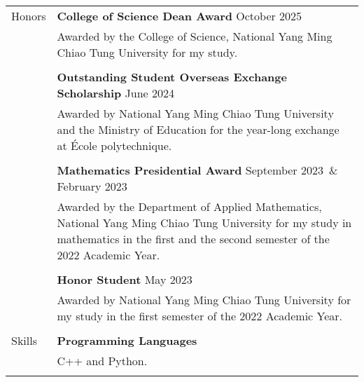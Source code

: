 \documentclass[letterpaper, 11pt]{article}
\newcommand{\spaceand}{\,\&\ \,}
\begin{document}
\begin{center}
\begin{longtable}{p{0.76in}p{5.93in}}
        {\textcolor{OliveGreen}{Honors}} & \textbf{College of Science Dean Award} \hfill October 2025\\
        & Awarded by the College of Science, National Yang Ming Chiao Tung University for my study. \\
        & \\
        & \textbf{Outstanding Student Overseas Exchange Scholarship} \hfill June 2024\\
        & Awarded by National Yang Ming Chiao Tung University and the Ministry of Education for the year-long exchange at \'Ecole polytechnique. \\
        & \\
        & \textbf{Mathematics Presidential Award} \hfill September 2023 \spaceand February 2023\\
        & Awarded by the Department of Applied Mathematics, National Yang Ming Chiao Tung University for my study in mathematics in the first and the second semester of the 2022 Academic Year.\\
        & \\
        & \textbf{Honor Student} \hfill May 2023\\
        & Awarded by National Yang Ming Chiao Tung University for my study in the first semester of the 2022 Academic Year. \\
        & \\

        
        {\textcolor{OliveGreen}{Skills}} 
        & \textbf{Programming Languages}\\
        & C++ and Python.\\
        & \\


\end{longtable}
\end{center}
\end{document}
